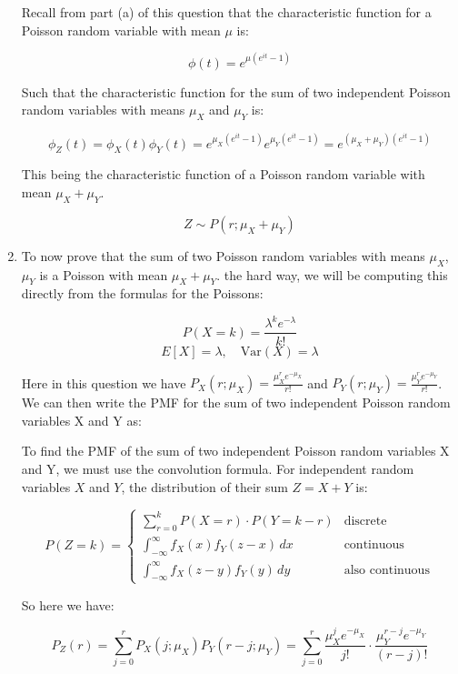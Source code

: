\documentclass[10pt]{article}
\begin{document}
\begin{enumerate}[label=(\alph*)]
	      Recall from part (a) of this question that the characteristic function for a Poisson random variable with mean $\mu$ is:

	      \[ \phi(t) = e^{\mu (e^{it} - 1)} \]

	      Such that the characteristic function for the sum of two independent Poisson random variables with means $\mu_{X}$ and $\mu_{Y}$ is:

	      \[ \boxed{\phi_{Z}(t) = \phi_{X}(t) \phi_{Y}(t) = e^{\mu_X (e^{it} - 1)} e^{\mu_Y (e^{it} - 1)} = e^{(\mu_X + \mu_Y)(e^{it} - 1)} } \]

	      This being the characteristic function of a Poisson random variable with mean $\mu_X + \mu_Y$.

	      \[\boxed{Z \sim P(r; \mu_X + \mu_Y)} \]

	\item To now prove that the sum of two Poisson random variables with means $\mu_{X}$, $\mu_{Y}$ is a Poisson with mean $\mu_{X}+\mu_{Y}$. the hard way, we will be computing this directly from the formulas for the Poissons:

	      \[ P(X = k) = \frac{\lambda^k e^{-\lambda}}{k!} \]
	      \[ E[X] = \lambda, \quad \text{Var}(X) = \lambda \]

	      Here in this question we have $P_{X}(r; \mu_X) = \frac{\mu_X^r e^{-\mu_X}}{r!}$ and $P_{Y}(r; \mu_Y) = \frac{\mu_Y^r e^{-\mu_Y}}{r!}$. We can then write the PMF for the sum of two independent Poisson random variables X and Y as:

	      To find the PMF of the sum of two independent Poisson random variables X and Y, we must use the convolution formula. For independent random variables $X$ and $Y$, the distribution of their sum $Z = X + Y$ is:

	      \[ P(Z = k) = \begin{cases}
			      \sum_{r=0}^{k} P(X = r) \cdot P(Y = k - r)      & \text{discrete}        \\
			      \int_{-\infty}^{\infty} f_X(x) f_Y(z - x) \, dx & \text{continuous}      \\
			      \int_{-\infty}^{\infty} f_X(z - y) f_Y(y) \, dy & \text{also continuous}
		      \end{cases} \]

	      So here we have:

	      \[ P_Z(r) = \sum_{j=0}^{r} P_X(j; \mu_X) P_Y(r - j; \mu_Y) = \sum_{j=0}^{r} \frac{\mu_X^j e^{-\mu_X}}{j!} \cdot \frac{\mu_Y^{r - j} e^{-\mu_Y}}{(r - j)!} \]


\end{enumerate}
\end{document}
